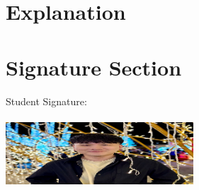 \documentclass{article}
\begin{document}
\section*{Explanation}

\section*{Signature Section}
Student Signature: \\\\
\includegraphics[width=7cm]{signature.png}
\underline{\hspace{15cm}} \\
\end{document}
